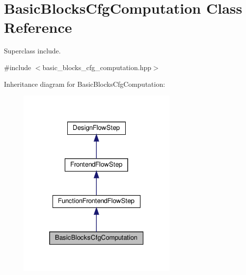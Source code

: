 \hypertarget{classBasicBlocksCfgComputation}{}\section{Basic\+Blocks\+Cfg\+Computation Class Reference}
\label{classBasicBlocksCfgComputation}


Superclass include.  




{\ttfamily \#include $<$basic\+\_\+blocks\+\_\+cfg\+\_\+computation.\+hpp$>$}



Inheritance diagram for Basic\+Blocks\+Cfg\+Computation\+:
\nopagebreak
\begin{figure}[H]
\begin{center}
\leavevmode
\includegraphics[width=223pt]{d6/d6c/classBasicBlocksCfgComputation__inherit__graph}
\end{center}
\end{figure}


